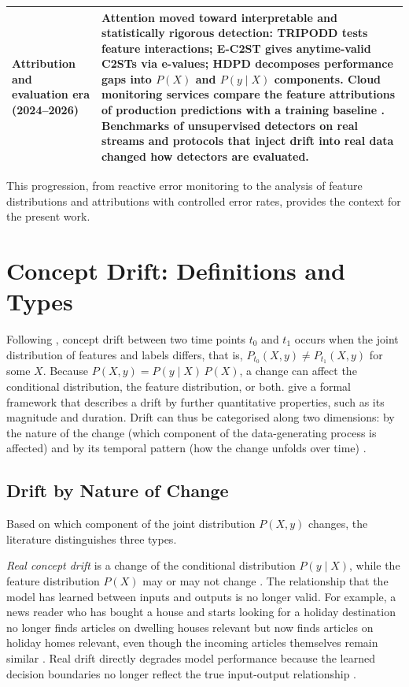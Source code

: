 \begin{table}[!htbp]
\begin{tabular}{>{\raggedright\arraybackslash}p{3.4cm}>{\raggedright\arraybackslash}p{10.4cm}}
\addlinespace
Attribution and evaluation era (2024--2026) & Attention moved toward interpretable and statistically rigorous detection: TRIPODD \citep{TRIPODD2024} tests feature interactions; E-C2ST \citep{EC2ST2024} gives anytime-valid C2STs via e-values; HDPD \citep{HDPD2024} decomposes performance gaps into $P(X)$ and $P(y \mid X)$ components. Cloud monitoring services compare the feature attributions of production predictions with a training baseline \citep{TalySato2021, AWSSageMaker2025}. Benchmarks of unsupervised detectors on real streams \citep{Lukats2024} and protocols that inject drift into real data \citep{CerqueiraKDD2026} changed how detectors are evaluated. \\
\bottomrule
\end{tabular}
\end{table}

This progression, from reactive error monitoring to the analysis of feature distributions and attributions with controlled error rates, provides the context for the present work.

\section{Concept Drift: Definitions and Types}
\label{sec:lit-types}
Following \citet{Gama2014}, concept drift between two time points $t_0$ and $t_1$ occurs when the joint distribution of features and labels differs, that is, $P_{t_0}(X, y) \neq P_{t_1}(X, y)$ for some $X$. Because $P(X, y) = P(y \mid X)\,P(X)$, a change can affect the conditional distribution, the feature distribution, or both. \citet{Webb2016} give a formal framework that describes a drift by further quantitative properties, such as its magnitude and duration. Drift can thus be categorised along two dimensions: by the nature of the change (which component of the data-generating process is affected) and by its temporal pattern (how the change unfolds over time) \citep{Lu2018, Gama2014}.

\subsection{Drift by Nature of Change}
Based on which component of the joint distribution $P(X, y)$ changes, the literature \citep{Lu2018, Gama2014, Tsymbal2004} distinguishes three types.

\emph{Real concept drift} is a change of the conditional distribution $P(y \mid X)$, while the feature distribution $P(X)$ may or may not change \citep{Lu2018, Zliobaite2010}. The relationship that the model has learned between inputs and outputs is no longer valid. For example, a news reader who has bought a house and starts looking for a holiday destination no longer finds articles on dwelling houses relevant but now finds articles on holiday homes relevant, even though the incoming articles themselves remain similar \citep{Gama2014}. Real drift directly degrades model performance because the learned decision boundaries no longer reflect the true input-output relationship \citep{Lu2018}.


